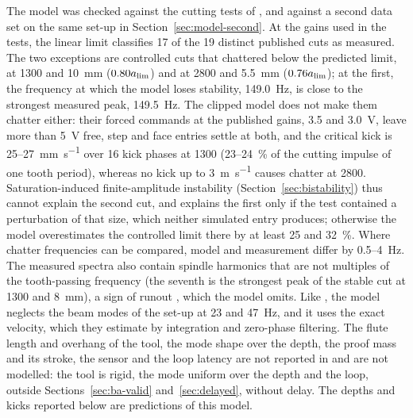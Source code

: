 The model was checked against the cutting tests of \citet{ozsoy2026robust}, and against a second data set on the same set-up in Section~\ref{sec:model-second}. At the gains used in the tests, the linear limit classifies 17 of the 19 distinct published cuts as measured. The two exceptions are controlled cuts that chattered below the predicted limit, at \SI{1300}{\rpm} and \SI{10}{\milli\metre} ($0.80a_{\lim}$) and at \SI{2800}{\rpm} and \SI{5.5}{\milli\metre} ($0.76a_{\lim}$); at the first, the frequency at which the model loses stability, \SI{149.0}{\hertz}, is close to the strongest measured peak, \SI{149.5}{\hertz}. The clipped model does not make them chatter either: their forced commands at the published gains, 3.5 and \SI{3.0}{\volt}, leave more than \SI{5}{\volt} free, step and face entries settle at both, and the critical kick is 25--\SI{27}{\milli\metre\per\second} over 16 kick phases at \SI{1300}{\rpm} (23--\SI{24}{\percent} of the cutting impulse of one tooth period), whereas no kick up to \SI{3}{\metre\per\second} causes chatter at \SI{2800}{\rpm}. Saturation-induced finite-amplitude instability (Section~\ref{sec:bistability}) thus cannot explain the second cut, and explains the first only if the test contained a perturbation of that size, which neither simulated entry produces; otherwise the model overestimates the controlled limit there by at least 25 and \SI{32}{\percent}.
Where chatter frequencies can be compared, model and measurement differ by 0.5--\SI{4}{\hertz}. The measured spectra also contain spindle harmonics that are not multiples of the tooth-passing frequency (the seventh is the strongest peak of the stable cut at \SI{1300}{\rpm} and \SI{8}{\milli\metre}), a sign of runout \citep{insperger2008chatter}, which the model omits. Like \citet{ozsoy2026robust}, the model neglects the beam modes of the set-up at 23 and \SI{47}{\hertz}, and it uses the exact velocity, which they estimate by integration and zero-phase filtering. The flute length and overhang of the tool, the mode shape over the depth, the proof mass and its stroke, the sensor and the loop latency are not reported in \citet{ozsoy2026robust} and are not modelled: the tool is rigid, the mode uniform over the depth and the loop, outside Sections~\ref{sec:ba-valid} and~\ref{sec:delayed}, without delay. The depths and kicks reported below are predictions of this model.
